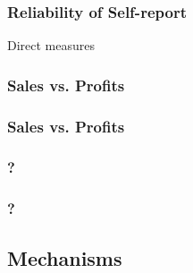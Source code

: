 \documentclass[hideothersubsections, usenames,dvipsnames,11pt]{beamer}
\newenvironment{itemize_3pt}{\itemize\addtolength{\itemsep}{3pt}}{\enditemize}
\begin{document}
\begin{frame}
\frametitle{Reliability of Self-report}
	\begin{itemize_3pt}
	\item Direct measures \citep{deMel2009}
	\vspace{0.1in}
	\end{itemize_3pt}
\end{frame}


\begin{frame}
\frametitle{Sales vs. Profits}
	\begin{itemize_3pt}
	\item  \citep{deMel2009}
	\vspace{0.1in}
	\end{itemize_3pt}
\end{frame}

\begin{frame}
\frametitle{Sales vs. Profits}
	\begin{itemize_3pt}
	\item \citep{deMel2009}
	\vspace{0.1in}
	\end{itemize_3pt}
\end{frame}


\begin{frame}
\frametitle{?}
	\begin{itemize_3pt}
	\item 
	\vspace{0.1in}
	\end{itemize_3pt}
\end{frame}

\begin{frame}
\frametitle{?}
	\begin{itemize_3pt}
	\item 
	\vspace{0.1in}
	\end{itemize_3pt}
\end{frame}


\subsection{Mechanisms}
\end{document}
